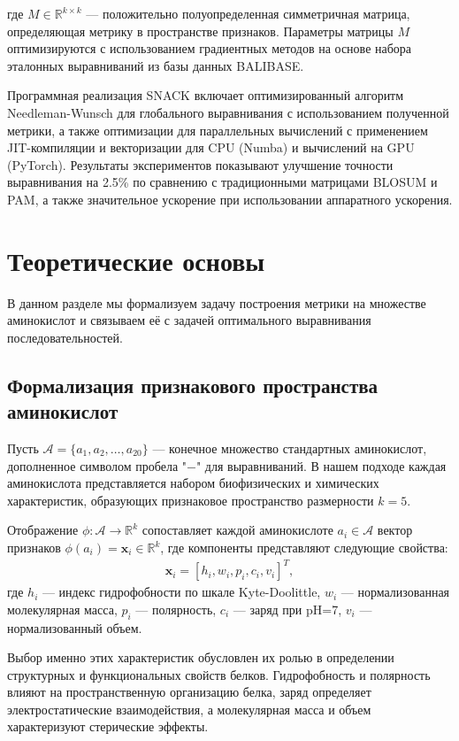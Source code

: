 \documentclass[12pt]{article}
\begin{document}
где $M \in \mathbb{R}^{k \times k}$ — положительно полуопределенная симметричная матрица, определяющая метрику в пространстве признаков. Параметры матрицы $M$ оптимизируются с использованием градиентных методов на основе набора эталонных выравниваний из базы данных BALIBASE.

Программная реализация SNACK включает оптимизированный алгоритм Needleman-Wunsch для глобального выравнивания с использованием полученной метрики, а также оптимизации для параллельных вычислений с применением JIT-компиляции и векторизации для CPU (Numba) и вычислений на GPU (PyTorch). Результаты экспериментов показывают улучшение точности выравнивания на 2.5\% по сравнению с традиционными матрицами BLOSUM и PAM, а также значительное ускорение при использовании аппаратного ускорения.

\section{Теоретические основы}

В данном разделе мы формализуем задачу построения метрики на множестве аминокислот и связываем её с задачей оптимального выравнивания последовательностей.

\subsection{Формализация признакового пространства аминокислот}

Пусть $\mathcal{A} = \{a_1, a_2, \dots, a_{20}\}$ — конечное множество стандартных аминокислот, дополненное символом пробела "$-$" для выравниваний. В нашем подходе каждая аминокислота представляется набором биофизических и химических характеристик, образующих признаковое пространство размерности $k = 5$.

Отображение $\phi: \mathcal{A} \rightarrow \mathbb{R}^k$ сопоставляет каждой аминокислоте $a_i \in \mathcal{A}$ вектор признаков $\phi(a_i) = \mathbf{x}_i \in \mathbb{R}^k$, где компоненты представляют следующие свойства:
\begin{align}
\mathbf{x}_i = [h_i, w_i, p_i, c_i, v_i]^T,
\end{align}
где $h_i$ — индекс гидрофобности по шкале Kyte-Doolittle, $w_i$ — нормализованная молекулярная масса, $p_i$ — полярность, $c_i$ — заряд при pH=7, $v_i$ — нормализованный объем.

Выбор именно этих характеристик обусловлен их ролью в определении структурных и функциональных свойств белков. Гидрофобность и полярность влияют на пространственную организацию белка, заряд определяет электростатические взаимодействия, а молекулярная масса и объем характеризуют стерические эффекты.
\end{document}
